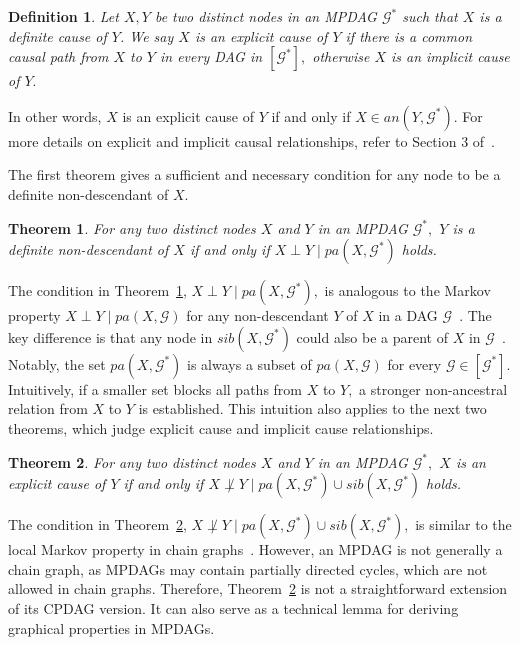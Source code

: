 \documentclass{article}
\newtheorem{definition}{Definition}
\newtheorem{theorem}{Theorem}
\begin{document}
\begin{definition}
Let $X,Y$ be two distinct nodes in an MPDAG $\mathcal{G}^*$ such that $X$ is a definite cause of $Y$.
We say $X$ is an explicit cause of $Y$ if there is a common causal path from $X$ to $Y$ in every DAG in $\left[\mathcal{G}^*\right],$ otherwise $X$ is an implicit cause of $Y.$
\end{definition}

In other words, $X$ is an explicit cause of $Y$ if and only if $X\in an(Y,\mathcal{G}^*).$ For more details on explicit and implicit causal relationships, refer to Section 3 of~\citep{fang2022local}.

The first theorem gives a sufficient and necessary condition for any node to be a definite non-descendant of $X.$

\begin{theorem}
\label{thm:definite non-cause}
For any two distinct nodes $X$ and $Y$ in an MPDAG $\mathcal{G}^*,$ $Y$ is a definite non-descendant of $X$ if and only if $X\perp Y\mid pa(X,\mathcal{G}^*)$ holds.
\end{theorem}

The condition in Theorem~\ref{thm:definite non-cause}, $X\perp Y\mid pa(X,\mathcal{G}^*),$ is analogous to the Markov property $X\perp Y\mid pa(X,\mathcal{G})$ for any non-descendant $Y$ of $X$ in a DAG $\mathcal{G}$~\citep{lauritzen1990independence, lauritzen1996graphical}. The key difference is that any node in $sib(X,\mathcal{G}^*)$ could also be a parent of $X$ in $\mathcal{G}$~\citep{meek1995causal}. Notably, the set $pa(X,\mathcal{G}^*)$ is always a subset of $pa(X,\mathcal{G})$ for every $\mathcal{G}\in [\mathcal{G}^*].$ Intuitively, if a smaller set blocks all paths from $X$ to $Y,$ a stronger non-ancestral relation from $X$ to $Y$ is established. This intuition also applies to the next two theorems, which judge explicit cause and implicit cause relationships.

\begin{theorem}
\label{thm:explicit cause}
For any two distinct nodes $X$ and $Y$ in an MPDAG $\mathcal{G}^*,$ $X$ is an explicit cause of $Y$ if and only if $X \not\perp Y\mid pa(X,\mathcal{G}^*)\cup sib(X,\mathcal{G}^*)$ holds.
\end{theorem}

The condition in Theorem~\ref{thm:explicit cause}, $X \not\perp Y\mid pa(X,\mathcal{G}^*)\cup sib(X,\mathcal{G}^*),$ is similar to the local Markov property in chain graphs~\citep{frydenberg1990chain}. However, an MPDAG is not generally a chain graph, as MPDAGs may contain partially directed cycles, which are not allowed in chain graphs. Therefore, Theorem~\ref{thm:explicit cause} is not a straightforward extension of its CPDAG version. It can also serve as a technical lemma for deriving graphical properties in MPDAGs.
\end{document}
